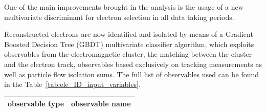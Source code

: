 One of the main improvements brought in the analysis is the usage of a new multivariate discriminant for electron selection in all data taking periods.

Reconstructed electrons are now identified and isolated by means of a Gradient Boosted Decision Tree (GBDT) multivariate classifier algorithm, which exploits observables from the electromagnetic cluster, the matching between the cluster and the electron track, observables based exclusively on tracking measurements as well as particle flow isolation sums. The full list of observables used can be found in the Table~\ref{tab:ele_ID_input_variables}.

 \begin{table}[h!]
\scriptsize
    \centering
    \begin{tabular}{c|l}
\hline %
\hline %
observable type    &  observable name      	\\
\hline %


\end{tabular}
\end{table}

